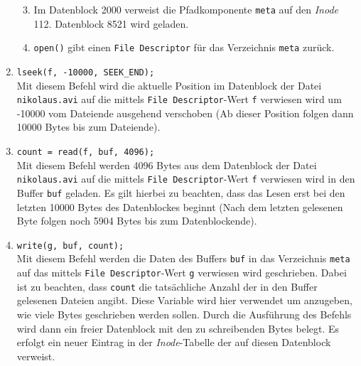 \documentclass{ti2}
\begin{document}
\begin{enumerate}
\begin{enumerate}
			\setcounter{enumii}{2}
			\item Im Datenblock 2000 verweist die Pfadkomponente \texttt{meta} auf den \textit{Inode} 112. Datenblock 8521 wird geladen.
			\item \texttt{open()} gibt einen \texttt{File Descriptor} für das Verzeichnis \texttt{meta} zurück.
		\end{enumerate}
		\item \texttt{lseek(f, -10000, SEEK\_END);}\\
		Mit diesem Befehl wird die aktuelle Position im Datenblock der Datei \texttt{nikolaus.avi} auf die mittels \texttt{File Descriptor}-Wert \texttt{f} verwiesen wird um -10000 vom Dateiende ausgehend verschoben (Ab dieser Position folgen dann 10000 Bytes bis zum Dateiende).
		\item \texttt{count = read(f, buf, 4096);}\\
		Mit diesem Befehl werden 4096 Bytes aus dem Datenblock der Datei \texttt{nikolaus.avi} auf die mittels \texttt{File Descriptor}-Wert \texttt{f} verwiesen wird in den Buffer \texttt{buf} geladen. Es gilt hierbei zu beachten, dass das Lesen erst bei den letzten 10000 Bytes des Datenblockes beginnt (Nach dem letzten gelesenen Byte folgen noch 5904 Bytes bis zum Datenblockende).
		\item \texttt{write(g, buf, count);}\\
		Mit diesem Befehl werden die Daten des Buffers \texttt{buf} in das Verzeichnis \texttt{meta} auf das mittels \texttt{File Descriptor}-Wert \texttt{g} verwiesen wird geschrieben. Dabei ist zu beachten, dass \texttt{count} die tatsächliche Anzahl der in den Buffer gelesenen Dateien angibt. Diese Variable wird hier verwendet um anzugeben, wie viele Bytes geschrieben werden sollen. Durch die Ausführung des Befehls wird dann ein freier Datenblock mit den zu schreibenden Bytes belegt. Es erfolgt ein neuer Eintrag in der \textit{Inode}-Tabelle der auf diesen Datenblock verweist.
	\end{enumerate}
		
\end{document}
